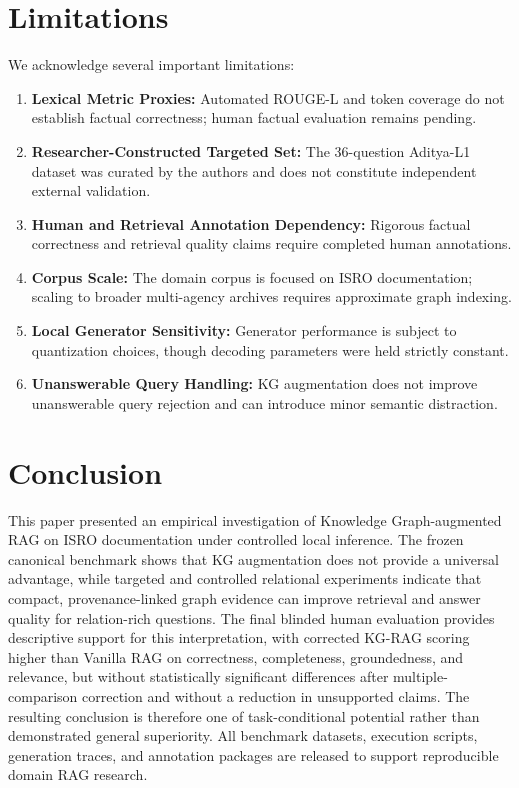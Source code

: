 \documentclass[conference]{IEEEtran}
\begin{document}
\section{Limitations}
\label{sec:limitations}

We acknowledge several important limitations:
\begin{enumerate}
    \item \textbf{Lexical Metric Proxies:} Automated ROUGE-L and token coverage do not establish factual correctness; human factual evaluation remains pending.
    \item \textbf{Researcher-Constructed Targeted Set:} The 36-question Aditya-L1 dataset was curated by the authors and does not constitute independent external validation.
    \item \textbf{Human and Retrieval Annotation Dependency:} Rigorous factual correctness and retrieval quality claims require completed human annotations.
    \item \textbf{Corpus Scale:} The domain corpus is focused on ISRO documentation; scaling to broader multi-agency archives requires approximate graph indexing.
    \item \textbf{Local Generator Sensitivity:} Generator performance is subject to quantization choices, though decoding parameters were held strictly constant.
    \item \textbf{Unanswerable Query Handling:} KG augmentation does not improve unanswerable query rejection and can introduce minor semantic distraction.
\end{enumerate}

\section{Conclusion}
\label{sec:conclusion}

This paper presented an empirical investigation of Knowledge Graph-augmented RAG on ISRO documentation under controlled local inference. The frozen canonical benchmark shows that KG augmentation does not provide a universal advantage, while targeted and controlled relational experiments indicate that compact, provenance-linked graph evidence can improve retrieval and answer quality for relation-rich questions. The final blinded human evaluation provides descriptive support for this interpretation, with corrected KG-RAG scoring higher than Vanilla RAG on correctness, completeness, groundedness, and relevance, but without statistically significant differences after multiple-comparison correction and without a reduction in unsupported claims. The resulting conclusion is therefore one of task-conditional potential rather than demonstrated general superiority. All benchmark datasets, execution scripts, generation traces, and annotation packages are released to support reproducible domain RAG research.
\end{document}
